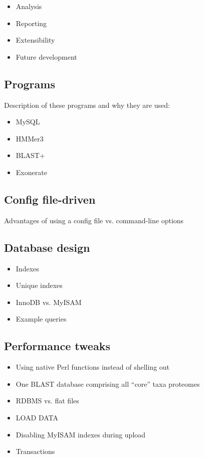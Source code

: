 \documentclass[a4paper]{scrartcl}
\begin{document}
\begin{itemize}
	\item Analysis
	\item Reporting
	\item Extensibility
	\item Future development
\end{itemize}

\subsection{Programs}

Description of these programs and why they are used:

\begin{itemize}
	\item MySQL
	\item HMMer3
	\item BLAST+
	\item Exonerate
\end{itemize}

\subsection{Config file-driven}

Advantages of using a config file vs. command-line options

\subsection{Database design}

\begin{itemize}
	\item Indexes
	\item Unique indexes
	\item InnoDB vs. MyISAM
	\item Example queries
\end{itemize}

\subsection{Performance tweaks}

\begin{itemize}
	\item Using native Perl functions instead of shelling out
	\item One BLAST database comprising all ``core'' taxa proteomes
	\item RDBMS vs. flat files
	\item LOAD DATA 
	\item Disabling MyISAM indexes during upload
	\item Transactions
\end{itemize}
\end{document}
